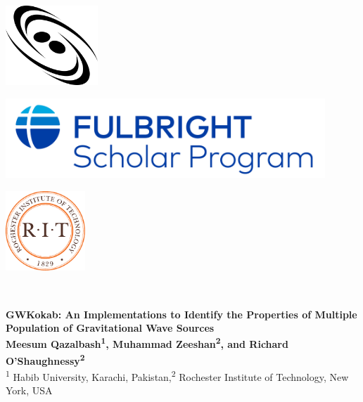 \documentclass[a0,portrait]{a0poster}
\begin{document}
\begin{minipage}[b]{0.33\linewidth}
\raggedright
\includegraphics[height=3cm,valign=t]{assets/logos/ccrg-logo.png}
\end{minipage}
%
\begin{minipage}[b]{0.33\linewidth}
\centering
\includegraphics[height=3cm,valign=t]{assets/logos/full_bright_logo.pdf}
\end{minipage}
% 
\begin{minipage}[b]{0.33\linewidth}
\raggedleft
\includegraphics[width=3cm,valign=t]{assets/logos/RIT_logo.pdf}
\end{minipage}\\

\vspace{3cm}
\begin{minipage}[h]{0.98\linewidth}
\centering \huge \color{HUPurple} \textbf{GWKokab: An Implementations to Identify the Properties of Multiple Population of Gravitational Wave Sources} \color{Black}\\ %
\Large \textbf{Meesum Qazalbash\textsuperscript{1}, Muhammad Zeeshan\textsuperscript{2}, and Richard O'Shaughnessy\textsuperscript{2}}\\ %
\normalsize \textsuperscript{1} Habib University, Karachi, Pakistan,\textsuperscript{2} Rochester Institute of Technology, New York, USA \\ %
\end{minipage}
\vspace{0.5cm}
\end{document}

